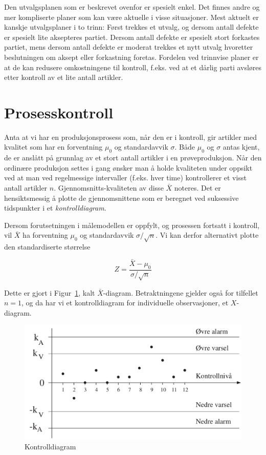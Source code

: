 Den utvalgsplanen som er beskrevet ovenfor er spesielt enkel.  Det 
finnes andre og mer kompliserte planer som kan være aktuelle i visse
situasjoner.  Mest aktuelt er kanskje utvalgsplaner i to trinn:  Først
trekkes et utvalg, og dersom antall defekte er spesielt lite aksepteres
partiet. Dersom antall defekte er spesielt stort forkastes partiet,
mens dersom antall defekte er moderat trekkes et nytt utvalg hvoretter
beslutningen om aksept eller forkastning foretas.  Fordelen ved trinnvise
planer er at de kan redusere omkostningene til kontroll, f.eks. ved at
et dårlig parti avsløres etter kontroll av et lite antall artikler.


\section{Prosesskontroll}
Anta at vi har en produksjonsprosess som, når den er i kontroll, gir
artikler med kvalitet som har en forventning ${\mu}_0$ og standardavvik
$\sigma$.  Både ${\mu}_0$ og $\sigma$ antas kjent, de er anslått 
på grunnlag av et stort antall artikler i en prøveproduksjon.
Når den ordinære produksjon settes i gang ønsker man å
holde kvaliteten under oppsikt ved at man ved regelmessige intervaller
(f.eks. hver time) kontrollerer et visst antall artikler $n$.
Gjennomsnitts-kvaliteten av disse $\bar{X}$ noteres.  Det er 
hensiktsmessig å plotte de gjennomsnittene som er beregnet ved 
suksessive tidspunkter i et {\em kontrolldiagram}.

Dersom forutsetningen i målemodellen er oppfylt, og prosessen 
fortsatt i kontroll, vil $\bar{X}$ ha forventning ${\mu}_0$ og 
standardavvik $\sigma /\sqrt{n}$.  Vi kan derfor alternativt plotte den 
standardiserte størrelse

\[    Z=\frac{\bar{X}-{\mu}_0}{\sigma /\sqrt{n}} \]

\noindent Dette er gjort i Figur~\ref{fig:kontrolldiagram}, kalt $\bar{X}$-diagram.
Betraktningene gjelder også for tilfellet $n=1$, og da har vi et
kontrolldiagram for individuelle observasjoner, et $X$-diagram.

\begin{figure}[ht]
\centering
 \includegraphics[scale=0.6]{figurer/fig15_2.pdf} 
\caption{Kontrolldiagram}
	\label{fig:kontrolldiagram}
\end{figure}

